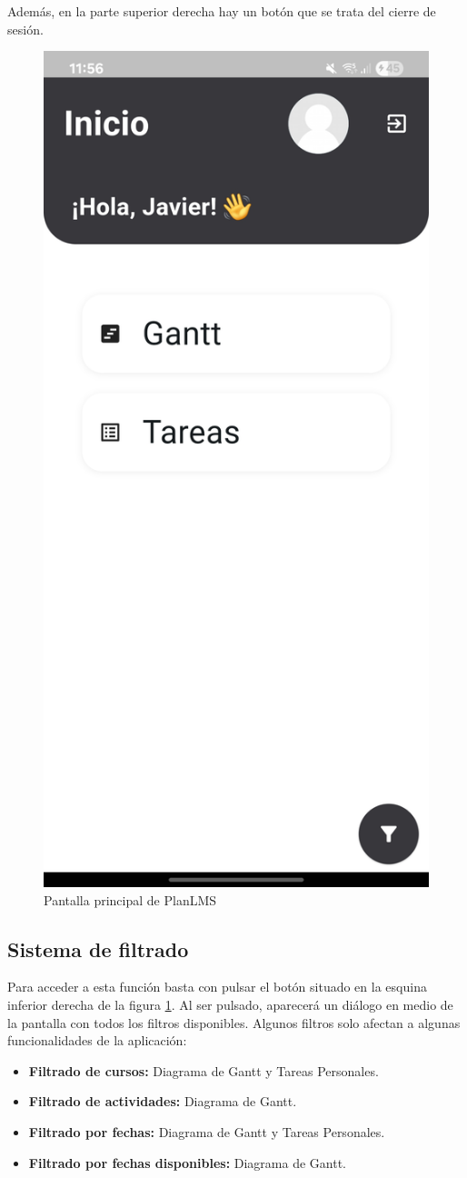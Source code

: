 Además, en la parte superior derecha hay un botón que se trata del cierre de sesión.
\begin{figure}[H]
    \centering
    \includegraphics[width=0.4\linewidth]{img/pantalla_principal.jpg}
    \caption{Pantalla principal de PlanLMS}
    \label{fig:pantalla_principal}
\end{figure}

\subsection{Sistema de filtrado}
Para acceder a esta función basta con pulsar el botón situado en la esquina inferior derecha de la figura \ref{fig:pantalla_principal}. Al ser pulsado, aparecerá un diálogo en medio de la pantalla con todos los filtros disponibles. Algunos filtros solo afectan a algunas funcionalidades de la aplicación:
\begin{itemize}
    \item \textbf{Filtrado de cursos:} Diagrama de Gantt y Tareas Personales.
    \item \textbf{Filtrado de actividades:} Diagrama de Gantt.
    \item \textbf{Filtrado por fechas:} Diagrama de Gantt y Tareas Personales.
    \item \textbf{Filtrado por fechas disponibles:} Diagrama de Gantt.
\end{itemize}

